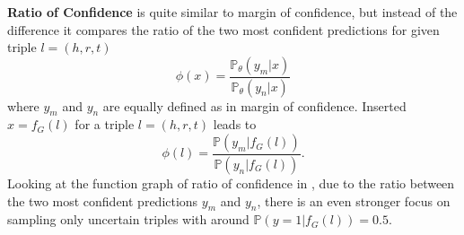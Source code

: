 \textbf{Ratio of Confidence}
is quite similar to margin of confidence, but instead of the difference it compares the ratio of the two most confident predictions for given triple $l = (h,r,t)$
\begin{equation}
    \phi(x) = \frac{\mathds{P}_{\theta}(y_m | x)}{\mathds{P}_{\theta}(y_n |x)}
\end{equation}
where $y_m$ and $y_n$ are equally defined as in margin of confidence.
Inserted $x = f_G(l)$ for a triple $l = (h,r,t)$ leads to
\begin{equation}
    \phi(l) = \frac{\mathds{P}(y_m |  f_G(l))}{\mathds{P}(y_n |f_G(l))}.
\end{equation}
Looking at the function graph of ratio of confidence in , due to the ratio between the two most confident predictions $y_m$ and $y_n$, there is an even stronger focus on sampling only uncertain triples with \ussoftmax around $\mathds{P}(y = 1 | f_G(l)) = 0.5$.


